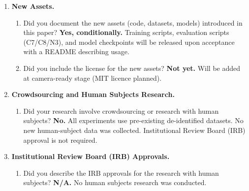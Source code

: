 \documentclass{article}
\begin{document}
\begin{enumerate}
\item \textbf{New Assets.}
\begin{enumerate}
  \item Did you document the new assets (code, datasets, models) introduced in this paper? \textbf{Yes, conditionally.} Training scripts, evaluation scripts (C7/C8/N3), and model checkpoints will be released upon acceptance with a README describing usage.
  \item Did you include the license for the new assets? \textbf{Not yet.} Will be added at camera-ready stage (MIT licence planned).
\end{enumerate}

\item \textbf{Crowdsourcing and Human Subjects Research.}
\begin{enumerate}
  \item Did your research involve crowdsourcing or research with human subjects? \textbf{No.} All experiments use pre-existing de-identified datasets. No new human-subject data was collected. Institutional Review Board (IRB) approval is not required.
\end{enumerate}

\item \textbf{Institutional Review Board (IRB) Approvals.}
\begin{enumerate}
  \item Did you describe the IRB approvals for the research with human subjects? \textbf{N/A.} No human subjects research was conducted.
\end{enumerate}

\end{enumerate}
\end{document}
